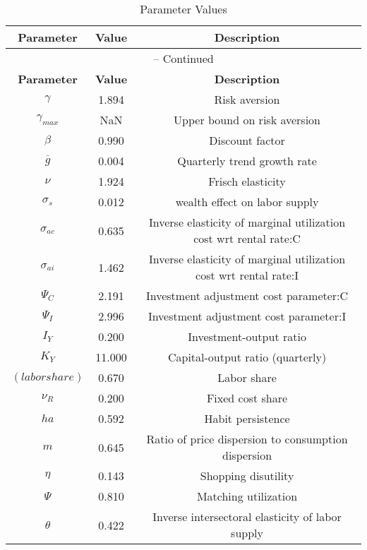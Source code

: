 \begin{center}
\begin{longtable}{ccc}
\caption{Parameter Values}\\%
\toprule%
\multicolumn{1}{c}{\textbf{Parameter}} &
\multicolumn{1}{c}{\textbf{Value}} &
 \multicolumn{1}{c}{\textbf{Description}}\\%
\midrule%
\endfirsthead
\multicolumn{3}{c}{{\tablename} \thetable{} -- Continued}\\%
\midrule%
\multicolumn{1}{c}{\textbf{Parameter}} &
\multicolumn{1}{c}{\textbf{Value}} &
  \multicolumn{1}{c}{\textbf{Description}}\\%
\midrule%
\endhead
${\gamma}$ 	 & 	 1.894 	 & 	 Risk aversion\\
${\gamma_{max}}$ 	 & 	  NaN 	 & 	 Upper bound on risk aversion\\
${\beta}$ 	 & 	 0.990 	 & 	 Discount factor\\
${\overline{g}}$ 	 & 	 0.004 	 & 	 Quarterly trend growth rate\\
$\nu$ 	 & 	 1.924 	 & 	 Frisch elasticity\\
$\sigma_s$ 	 & 	 0.012 	 & 	 wealth effect on labor supply\\
${\sigma_{ac}}$ 	 & 	 0.635 	 & 	 Inverse elasticity of marginal utilization cost wrt rental rate:C\\
${\sigma_{ai}}$ 	 & 	 1.462 	 & 	 Inverse elasticity of marginal utilization cost wrt rental rate:I\\
${\Psi_C}$ 	 & 	 2.191 	 & 	 Investment adjustment cost parameter:C\\
${\Psi_I}$ 	 & 	 2.996 	 & 	 Investment adjustment cost parameter:I\\
${I_Y}$ 	 & 	 0.200 	 & 	 Investment-output ratio\\
${K_Y}$ 	 & 	 11.000 	 & 	 Capital-output ratio (quarterly)\\
$(labor share)$ 	 & 	 0.670 	 & 	 Labor share\\
${\nu_R}$ 	 & 	 0.200 	 & 	 Fixed cost share\\
${ha}$ 	 & 	 0.592 	 & 	 Habit persistence\\
${m}$ 	 & 	 0.645 	 & 	 Ratio of price dispersion to consumption dispersion\\
${\eta}$ 	 & 	 0.143 	 & 	 Shopping disutility\\
${\Psi}$ 	 & 	 0.810 	 & 	 Matching utilization\\
${\theta}$ 	 & 	 0.422 	 & 	 Inverse intersectoral elasticity of labor supply\\

\end{longtable}
\end{center}
